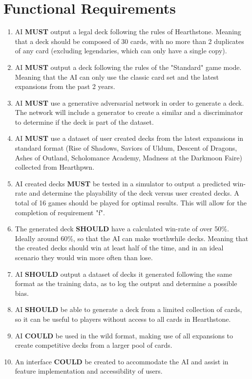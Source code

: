 \documentclass{report} %
\begin{document}
\section{Functional Requirements}
\begin{enumerate}
\item{ AI \textbf{MUST} output a legal deck following the rules of Hearthstone. Meaning that a deck should be composed of 30 cards, with no more than 2 duplicates of any card (excluding legendaries, which can only have a single copy).}
\item AI \textbf{MUST} output a deck following the rules of the "Standard" game mode. Meaning that the AI can only use the classic card set and the latest expansions from the past 2 years.
\item AI \textbf{MUST} use a generative adversarial network in order to generate a deck. The network will include a generator to create a similar and a discriminator to determine if the deck is part of the dataset.
\item AI \textbf{MUST} use a dataset of user created decks from the latest expansions in standard format (Rise of Shadows, Saviors of Uldum, Descent of Dragons, Ashes of Outland, Scholomance Academy, Madness at the Darkmoon Faire) collected from Hearthpwn.
\item AI created decks \textbf{MUST} be tested in a simulator to output a predicted win-rate and determine the playability of the deck versus user created decks. A total of 16 games should be played for optimal results. This will allow for the completion of requirement "f". 
\item The generated deck \textbf{SHOULD} have a calculated win-rate of over 50\%. Ideally around 60\%, so that the AI can make worthwhile decks. Meaning that the created decks should win at least half of the time, and in an ideal scenario they would win more often than lose.
\item AI \textbf{SHOULD} output a dataset of decks it generated following the same format as the training data, as to log the output and determine a possible bias.
\item AI \textbf{SHOULD} be able to generate a deck from a limited collection of cards, so it can be useful to players without access to all cards in Hearthstone.
\item AI \textbf{COULD} be used in the wild format, making use of all expansions to create competitive decks from a larger pool of cards.
		
\item An interface \textbf{COULD} be created to accommodate the AI and assist in feature implementation and accessibility of users. 
\end{enumerate}
\end{document}
